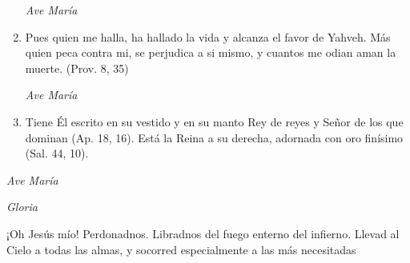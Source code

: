 \documentclass[a4paper,11pt, oneside]{report}
\begin{document}
\begin{enumerate}
          \textit{Ave María}

          \item Pues quien me halla, ha hallado la vida y alcanza el favor de Yahveh. Más quien peca contra mi, se perjudica a si mismo,
          y cuantos me odian aman la muerte. (Prov. 8, 35)

          \textit{Ave María}

          \item Tiene Él escrito en su vestido y en su manto Rey de reyes y Señor de los que dominan (Ap. 18, 16).
          Está la Reina a su derecha, adornada con oro finísimo (Sal. 44, 10).
        \end{enumerate}

        \textit{Ave María} \par
        \indent\textit{Gloria} \par
        \indent¡Oh Jesús mío! Perdonadnos. Libradnos del fuego enterno del infierno. Llevad al Cielo a todas las almas, y socorred especialmente a las más 
        necesitadas
      
\end{document}
